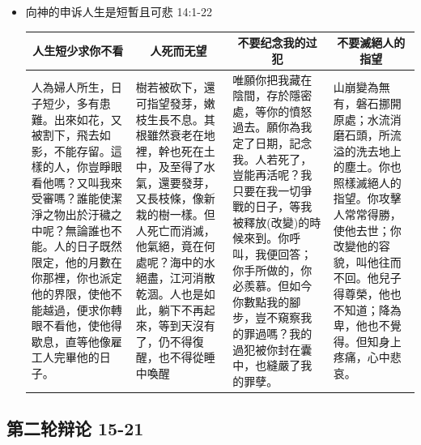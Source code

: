 \begin{itemize}
\begin{itemize}
\item 向神的申诉人生是短暫且可悲 14:1-22\\
\begin{table}[H]
\centering 
\begin{tabular}{p{12.8em}|p{}|p{12.5em}|p{}}    \toprule
\multicolumn{1}{c|}{人生短少求你不看}&\multicolumn{1}{c|}{人死而无望}&\multicolumn{1}{c|}{不要纪念我的过犯}&\multicolumn{1}{c}{不要滅絕人的指望}\\\hline
人為婦人所生，日子短少，多有患難。出來如花，又被割下，飛去如影，不能存留。這樣的人，你豈睜眼看他嗎？又叫我來受審嗎？誰能使潔淨之物出於汙穢之中呢？無論誰也不能。人的日子既然限定，他的月數在你那裡，你也派定他的界限，使他不能越過，便求你轉眼不看他，使他得歇息，直等他像雇工人完畢他的日子。
&樹若被砍下，還可指望發芽，嫩枝生長不息。其根雖然衰老在地裡，幹也死在土中，及至得了水氣，還要發芽，又長枝條，像新栽的樹一樣。但人死亡而消滅，他氣絕，竟在何處呢？海中的水絕盡，江河消散乾涸。人也是如此，躺下不再起來，等到天沒有了，仍不得復醒，也不得從睡中喚醒
&唯願你把我藏在陰間，存於隱密處，等你的憤怒過去。願你為我定了日期，記念我。人若死了，豈能再活呢？我只要在我一切爭戰的日子，等我被釋放(改變)的時候來到。你呼叫，我便回答；你手所做的，你必羨慕。但如今你數點我的腳步，豈不窺察我的罪過嗎？我的過犯被你封在囊中，也縫嚴了我的罪孽。
&山崩變為無有，磐石挪開原處；水流消磨石頭，所流溢的洗去地上的塵土。你也照樣滅絕人的指望。你攻擊人常常得勝，使他去世；你改變他的容貌，叫他往而不回。他兒子得尊榮，他也不知道；降為卑，他也不覺得。但知身上疼痛，心中悲哀。\\ \bottomrule
\end{tabular} 
\end{table}


\end{itemize}
\end{itemize}

\subsection{第二轮辩论 15-21}

